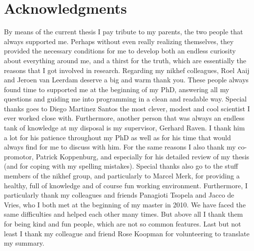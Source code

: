 \chapter*{Acknowledgments}
\chaptermark{}

By means of the current thesis I pay tribute to my parents, the two people that always
supported me. Perhaps without even really realizing themselves, they provided the necessary conditions
for me to develop both an endless curiosity about everything around me, and a thirst for the truth,
which are essentially the reasons that I got involved in research. Regarding my nikhef colleagues,
Roel Aaij and Jeroen van Leerdam deserve a big and warm thank you. These people always found time to
supported me at the beginning of my PhD, answering all my questions and guiding me into programming in
a clean and readable way. Special thanks goes to Diego Martinez Santos the most clever, modest
and cool scientist I ever worked close with. Furthermore, another person that was always an endless
tank of knowledge at my disposal is my supervisor, Gerhard Raven. I thank him a lot for his patience
throughout my PhD as well as for his time that would always find for me to discuss with him.
For the same reasons I also thank my co-promotor, Patrick Koppenburg, and especially for his detailed
review of my thesis (and for coping with my spelling mistakes). Special thanks also go to the stuff
members of the nikhef \lhcb group, and particularly to Marcel Merk, for providing a healthy, full
of knowledge and of course fun working environment. Furthermore, I particularly thank my colleagues and
friends Panagioti Tsopela and Jacco de Vries, who I both met at the beginning of my master in 2010.
We have faced the same difficulties and helped each other many times. But above all I thank them for
being kind and fun people, which are not so common features. Last but not least I thank my colleague
and friend Rose Koopman for volunteering to translate my summary.
